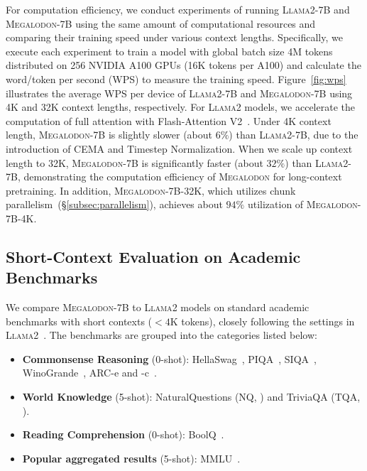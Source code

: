 For computation efficiency, we conduct experiments of running \textsc{Llama}2-7B and \textsc{Megalodon}-7B using the same amount of computational resources and comparing their training speed under various context lengths. Specifically, we execute each experiment to train a model with global batch size 4M tokens distributed on 256 NVIDIA A100 GPUs (16K tokens per A100) and calculate the word/token per second (WPS) to measure the training speed. 
Figure~\ref{fig:wps} illustrates the average WPS per device of \textsc{Llama}2-7B and \textsc{Megalodon}-7B using 4K and 32K context lengths, respectively. For \textsc{Llama}2 models, we accelerate the computation of full attention with Flash-Attention V2~\citep{dao2024flashattention}. Under 4K context length, \textsc{Megalodon}-7B is slightly slower (about $6\%$) than \textsc{Llama}2-7B, due to the introduction of CEMA and Timestep Normalization. When we scale up context length to 32K, \textsc{Megalodon}-7B is significantly faster (about $32\%$) than \textsc{Llama}2-7B, demonstrating the computation efficiency of \textsc{Megalodon} for long-context pretraining. In addition, \textsc{Megalodon}-7B-32K, which utilizes chunk parallelism~(\S\ref{subsec:parallelism}), achieves about $94\%$ utilization of \textsc{Megalodon}-7B-4K.

\subsection{Short-Context Evaluation on Academic Benchmarks}

We compare \textsc{Megalodon}-7B to \textsc{Llama}2 models on standard academic benchmarks with short contexts ($< 4$K tokens), closely following the settings in \textsc{Llama}2~\citep{touvron2023llama}.
The benchmarks are grouped into the categories listed below:

\begin{itemize}[leftmargin=*]
    \item \textbf{Commonsense Reasoning} (0-shot): HellaSwag~\citep{zellers2019hellaswag}, PIQA~\citep{bisk2020piqa}, SIQA~\citep{sap2019socialiqa}, WinoGrande~\citep{sakaguchi2021winogrande}, ARC-e and -c~\citep{clark2018think}.
    \item \textbf{World Knowledge} (5-shot): NaturalQuestions (NQ, \citet{kwiatkowski2019natural}) and TriviaQA (TQA, \citet{joshi2017triviaqa}).
    \item \textbf{Reading Comprehension} (0-shot): BoolQ~\citep{clark2019boolq}.
    \item \textbf{Popular aggregated results} (5-shot): MMLU~\citep{hendrycks2020measuring}.
\end{itemize}

